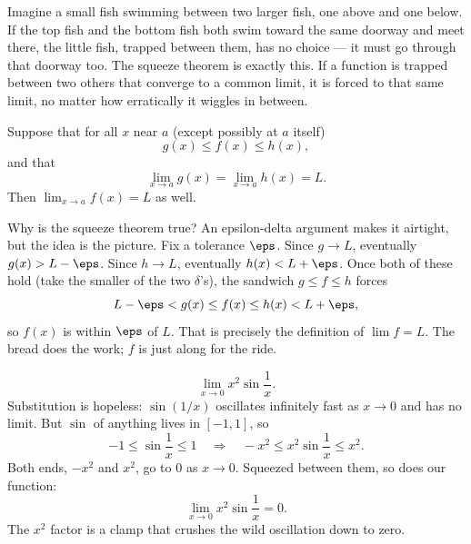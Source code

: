 \begin{intuitionbox}
Imagine a small fish swimming between two larger fish, one above and one below.
If the top fish and the bottom fish both swim toward the same doorway and meet
there, the little fish, trapped between them, has no choice --- it must go
through that doorway too. The squeeze theorem is exactly this. If a function
is trapped between two others that converge to a common limit, it is forced to
that same limit, no matter how erratically it wiggles in between.
\end{intuitionbox}

\begin{theorem}
\label{ch07:thm-squeeze}
Suppose that for all $x$ near $a$ (except possibly at $a$ itself)
\[
  g(x) \le f(x) \le h(x),
\]
and that
\[
  \lim_{x\to a} g(x) = \lim_{x\to a} h(x) = L.
\]
Then $\displaystyle\lim_{x\to a} f(x) = L$ as well.
\end{theorem}

\begin{whybox}
Why is the squeeze theorem true? An epsilon-delta argument makes it airtight,
but the idea is the picture. Fix a tolerance $\eps$. Since $g\to L$, eventually
$g(x) > L-\eps$. Since $h\to L$, eventually $h(x) < L+\eps$. Once both of these
hold (take the smaller of the two $\delta$'s), the sandwich $g\le f\le h$ forces
\[
  L-\eps < g(x) \le f(x) \le h(x) < L+\eps,
\]
so $f(x)$ is within $\eps$ of $L$. That is precisely the definition of
$\lim f = L$. The bread does the work; $f$ is just along for the ride.
\end{whybox}

\begin{example}
\label{ch07:ex-squeeze-osc}
\[
  \lim_{x\to 0} x^{2}\sin\!\frac{1}{x}.
\]
Substitution is hopeless: $\sin(1/x)$ oscillates infinitely fast as $x\to 0$
and has no limit. But $\sin$ of anything lives in $[-1,1]$, so
\[
  -1 \le \sin\frac1x \le 1
  \quad\Longrightarrow\quad
  -x^{2} \le x^{2}\sin\frac1x \le x^{2}.
\]
Both ends, $-x^2$ and $x^2$, go to $0$ as $x\to 0$. Squeezed between them, so
does our function:
\[
  \lim_{x\to 0} x^{2}\sin\frac1x = 0.
\]
The $x^{2}$ factor is a clamp that crushes the wild oscillation down to zero.
\end{example}

